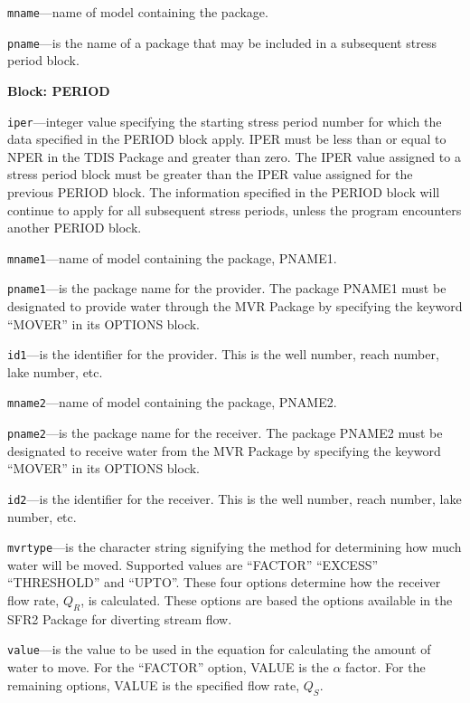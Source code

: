 \begin{description}
\item \texttt{mname}---name of model containing the package.

\item \texttt{pname}---is the name of a package that may be included in a subsequent stress period block.

\end{description}
\item \textbf{Block: PERIOD}

\begin{description}
\item \texttt{iper}---integer value specifying the starting stress period number for which the data specified in the PERIOD block apply.  IPER must be less than or equal to NPER in the TDIS Package and greater than zero.  The IPER value assigned to a stress period block must be greater than the IPER value assigned for the previous PERIOD block.  The information specified in the PERIOD block will continue to apply for all subsequent stress periods, unless the program encounters another PERIOD block.

\item \texttt{mname1}---name of model containing the package, PNAME1.

\item \texttt{pname1}---is the package name for the provider.  The package PNAME1 must be designated to provide water through the MVR Package by specifying the keyword ``MOVER'' in its OPTIONS block.

\item \texttt{id1}---is the identifier for the provider.  This is the well number, reach number, lake number, etc.

\item \texttt{mname2}---name of model containing the package, PNAME2.

\item \texttt{pname2}---is the package name for the receiver.  The package PNAME2 must be designated to receive water from the MVR Package by specifying the keyword ``MOVER'' in its OPTIONS block.

\item \texttt{id2}---is the identifier for the receiver.  This is the well number, reach number, lake number, etc.

\item \texttt{mvrtype}---is the character string signifying the method for determining how much water will be moved.  Supported values are ``FACTOR'' ``EXCESS'' ``THRESHOLD'' and ``UPTO''.  These four options determine how the receiver flow rate, $Q_R$, is calculated.  These options are based the options available in the SFR2 Package for diverting stream flow.

\item \texttt{value}---is the value to be used in the equation for calculating the amount of water to move.  For the ``FACTOR'' option, VALUE is the $\alpha$ factor.  For the remaining options, VALUE is the specified flow rate, $Q_S$.

\end{description}

